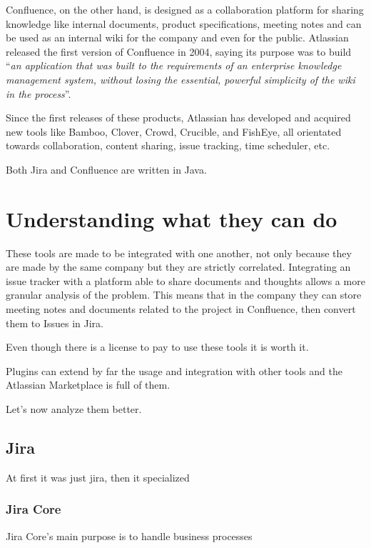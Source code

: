 Confluence, on the other hand, is designed as a collaboration platform for sharing knowledge like internal documents, product specifications, meeting notes and can be used as an internal wiki for the company and even for the public.
Atlassian released the first version of Confluence in 2004, saying its purpose was to build ``\textit{an application that was built to the requirements of an enterprise knowledge management system, without losing the essential, powerful simplicity of the wiki in the process}''.

Since the first releases of these products, Atlassian has developed and acquired new tools like Bamboo, Clover, Crowd, Crucible, and FishEye, all orientated towards collaboration, content sharing, issue tracking, time scheduler, etc.

Both Jira and Confluence are written in Java.

\section{Understanding what they can do}
These tools are made to be integrated with one another, not only because they are made by the same company but they are strictly correlated.
Integrating an issue tracker with a platform able to share documents and thoughts allows a more granular analysis of the problem.
This means that in the company they can store meeting notes and documents related to the project in Confluence, then convert them to Issues in Jira.

Even though there is a license to pay to use these tools it is worth it.

Plugins can extend by far the usage and integration with other tools and the Atlassian Marketplace is full of them.

Let's now analyze them better.
	
	\subsection{Jira}
	
		At first it was just jira, then it specialized
	
		\subsubsection{Jira Core}
			Jira Core's main purpose is to handle business processes 
			
